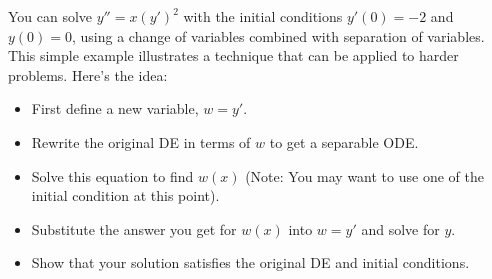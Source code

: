 \documentclass[12pt,letterpaper]{hmcpset}
\begin{document}
\begin{solution}
	\vfill
\end{solution}
\newpage

\begin{problem}[6]
  You can solve $y''=x\left(y'\right)^2$ with the initial conditions $y'(0) = -2$ and $y(0) = 0$, using a change of variables combined with  separation of variables.  This simple example illustrates a technique that can be applied to harder problems.  Here's the idea:  
  \begin{itemize}
  	\item First define a new variable, $w=y'$.  
  	\item Rewrite the original DE in terms of $w$ to get a separable ODE. 
  	\item Solve this equation to find $w(x)$ (Note: You may want to use one of the initial condition at this point).  
  	\item Substitute the answer you get for $w(x)$ into $w=y'$ and solve for $y$.  
  	\item Show that your solution satisfies the original DE and initial conditions.
  \end{itemize}
\end{problem}

\begin{solution}
  \vfill
\end{solution}
\newpage
\end{document}
